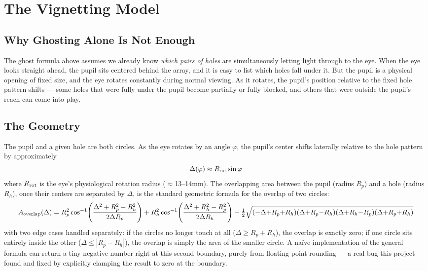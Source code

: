 \section{The Vignetting Model}

\subsection{Why Ghosting Alone Is Not Enough}

The ghost formula above assumes we already know \emph{which pairs of holes}
are simultaneously letting light through to the eye. When the eye looks
straight ahead, the pupil sits centered behind the array, and it is easy to
list which holes fall under it. But the pupil is a physical opening of fixed
size, and the eye rotates constantly during normal viewing. As it rotates,
the pupil's position relative to the fixed hole pattern shifts --- some
holes that were fully under the pupil become partially or fully blocked,
and others that were outside the pupil's reach can come into play.

\subsection{The Geometry}

The pupil and a given hole are both circles. As the eye rotates by an angle
$\varphi$, the pupil's center shifts laterally relative to the hole pattern
by approximately
\begin{equation}
\Delta(\varphi) \approx R_{\rm rot} \sin\varphi
\end{equation}
where $R_{\rm rot}$ is the eye's physiological rotation radius
($\approx$13--14mm). The overlapping area between the pupil (radius
$R_p$) and a hole (radius $R_h$), once their centers are separated by
$\Delta$, is the standard geometric formula for the overlap of two circles:
\begin{equation}
A_{\rm overlap}(\Delta) = R_p^2\cos^{-1}\!\left(\frac{\Delta^2+R_p^2-R_h^2}{2\Delta R_p}\right)
+ R_h^2\cos^{-1}\!\left(\frac{\Delta^2+R_h^2-R_p^2}{2\Delta R_h}\right)
- \tfrac12\sqrt{(-\Delta{+}R_p{+}R_h)(\Delta{+}R_p{-}R_h)(\Delta{+}R_h{-}R_p)(\Delta{+}R_p{+}R_h)}
\end{equation}
with two edge cases handled separately: if the circles no longer touch at
all ($\Delta \ge R_p+R_h$), the overlap is exactly zero; if one circle sits
entirely inside the other ($\Delta \le |R_p-R_h|$), the overlap is simply
the area of the smaller circle. A na\"ive implementation of the general
formula can return a tiny negative number right at this second boundary,
purely from floating-point rounding --- a real bug this project found and
fixed by explicitly clamping the result to zero at the boundary.

